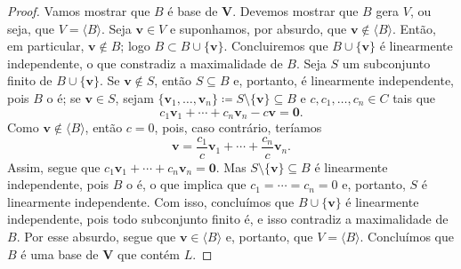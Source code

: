 \begin{proof}
	Vamos mostrar que $B$ é base de $\bm V$. Devemos mostrar que $B$ gera $V$, ou seja, que $V=\langle B \rangle$.
Seja $\bm v \in V$ e suponhamos, por absurdo, que $\bm v \notin \langle B \rangle$. Então, em particular, $\bm v \notin B$; logo $B \subset B \cup \{\bm v\}$. Concluiremos que $B \cup \{\bm v\}$ é linearmente independente, o que constradiz a maximalidade de $B$. Seja $S$ um subconjunto finito de $B \cup \{\bm v\}$. Se $\bm v \notin S$, então $S \subseteq B$ e, portanto, é linearmente independente, pois $B$ o é; se $\bm v \in S$, sejam $\{\bm v_1,\ldots,\bm v_n\} \coloneqq S \setminus \{\bm v\} \subseteq B$ e $c,c_1,\ldots,c_n \in C$ tais que
	\begin{equation*}
	c_1\bm v_1 + \cdots + c_n\bm v_n -c\bm v=\bm 0.
	\end{equation*}
Como $\bm v \notin \langle B \rangle$, então $c=0$, pois, caso contrário, teríamos
	\begin{equation*}
	\bm v=\frac{c_1}{c}\bm v_1 + \cdots + \frac{c_n}{c}\bm v_n.
	\end{equation*}
Assim, segue que $c_1\bm v_1 + \cdots + c_n\bm v_n=\bm 0$. Mas $S \setminus \{\bm v\} \subseteq B$ é linearmente independente, pois $B$ o é, o que implica que $c_1=\cdots=c_n=0$ e, portanto, $S$ é linearmente independente. Com isso, concluímos que $B \cup \{\bm v\}$ é linearmente independente, pois todo subconjunto finito é, e isso contradiz a maximalidade de $B$. Por esse absurdo, segue que $\bm v \in \langle B \rangle$ e, portanto, que $V=\langle B \rangle$. Concluímos que $B$ é uma base de $\bm V$ que contém $L$.
\end{proof}

